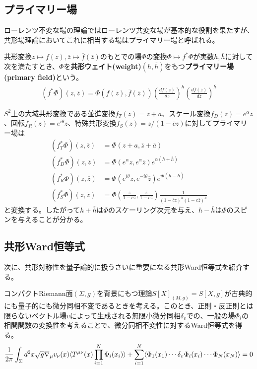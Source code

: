 \subsection{プライマリー場}
ローレンツ不変な場の理論ではローレンツ共変な場が基本的な役割を果たすが、共形場理論においてこれに相当する場はプライマリー場と呼ばれる。
\begin{oframed}
共形変換$z\mapsto f(z),\overline{z}\mapsto \overline{f}(\overline{z})$のもとでの場$\Phi$の変換$\Phi\mapsto f^\ast \Phi$が実数$h,\overline{h}$に対して次を満たすとき、$\Phi$を\textbf{共形ウェイト(weight)}$(h,\overline{h})$をもつ\textbf{プライマリー場(primary field)}という。
\begin{align}
(f^\ast\Phi)(z,\overline{z})=\Phi(f(z),\overline{f}(\overline{z}))\left(\frac{df(z)}{dz}\right)^h\left(\frac{d\overline{f}(\overline{z})}{d\overline{z}}\right)^{\overline{h}}
\end{align}
\end{oframed}

\begin{ex}
$S^2$上の大域共形変換である並進変換$f_T(z)=z+a$、スケール変換$f_D(z)=e^\alpha z$、回転$f_R(z)=e^{i\theta}z$、特殊共形変換$f_S(z)=z/(1-\overline{c}z)$に対してプライマリー場は
\begin{align}
(f_T^\ast\Phi)(z,\overline{z})&=\Phi(z+a,\overline{z}+\overline{a})\label{primarytranslation}\\
(f_D^\ast\Phi)(z,\overline{z})&=\Phi(e^\alpha z,e^\alpha\overline{z})e^{\alpha (h+\overline{h})}\label{primarydilation}\\
(f_R^\ast\Phi)(z,\overline{z})&=\Phi(e^{i\theta}z,e^{-i\theta}\overline{z})e^{i\theta (h-\overline{h})}\label{primaryrotation}\\
(f_S^\ast\Phi)(z,\overline{z})&=\Phi\left(\frac{z}{1-\overline{c}z},\frac{\overline{z}}{1-c\overline{z}}\right)\frac{1}{(1-\overline{c}z)^h(1-c\overline{z})^{\overline{h}}}
\end{align}
と変換する。したがって$h+\overline{h}$は$\Phi$のスケーリング次元を与え、$h-\overline{h}$は$\Phi$のスピンを与えることが分かる。
\end{ex}

\subsection{共形Ward恒等式}
次に、共形対称性を量子論的に扱うさいに重要になる共形Ward恒等式を紹介する。

コンパクトRiemann面$(\Sigma,g)$を背景にもつ理論$S[X]_{(M,g)}=S[X,g]$が古典的にも量子的にも微分同相不変であるときを考える。このとき、正則・反正則とは限らないベクトル場$v$によって生成される無限小微分同相$\delta_v$での、一般の場$\Phi_i$の相関関数の変換性を考えることで、微分同相不変性に対するWard恒等式を得る。
\begin{align}
\frac{1}{2\pi}\int_\Sigma d^2 x \sqrt{g} \nabla_\mu v_\nu(x) \langle T^{\mu\nu}(x)\prod_{i=1}^N \Phi_i(x_i) \rangle+ \sum_{i=1}^{N} \langle \Phi_1(x_1)\cdots\delta_v \Phi_i(x_i)\cdots \Phi_N(x_N) \rangle=0
\end{align}

